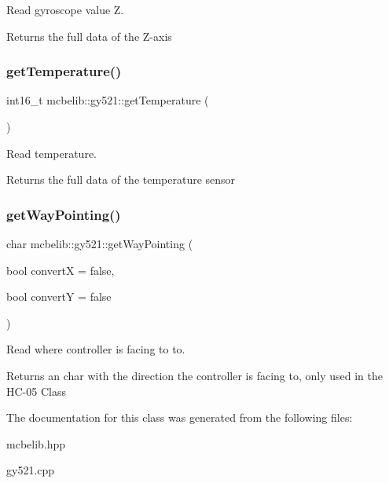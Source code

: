 Read gyroscope value Z. 

Returns the full data of the Z-\/axis \mbox{\label{classmcbelib_1_1gy521_abb1275aa14cf35844900e91fded2bad0}} 
\subsubsection{\texorpdfstring{get\+Temperature()}{getTemperature()}}
{\footnotesize\ttfamily int16\+\_\+t mcbelib\+::gy521\+::get\+Temperature (\begin{DoxyParamCaption}{ }\end{DoxyParamCaption})}



Read temperature. 

Returns the full data of the temperature sensor \mbox{\label{classmcbelib_1_1gy521_af0d109f92f90dd9c4ae28c6fdacd9a88}} 
\subsubsection{\texorpdfstring{get\+Way\+Pointing()}{getWayPointing()}}
{\footnotesize\ttfamily char mcbelib\+::gy521\+::get\+Way\+Pointing (\begin{DoxyParamCaption}\item[{bool}]{convertX = {\ttfamily false},  }\item[{bool}]{convertY = {\ttfamily false} }\end{DoxyParamCaption})}



Read where controller is facing to to. 

Returns an char with the direction the controller is facing to, only used in the H\+C-\/05 Class 

The documentation for this class was generated from the following files\+:\begin{DoxyCompactItemize}
\item 
mcbelib.\+hpp\item 
gy521.\+cpp\end{DoxyCompactItemize}
